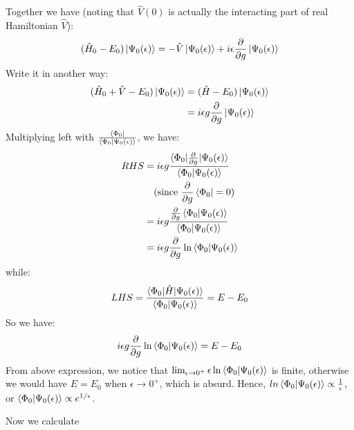 \documentclass{article}
\numberwithin{equation}{subsection} %
\begin{document}
Together we have (noting that $\hat{V}(0)$ is actually the interacting part of real Hamiltonian $\hat{V}$):
\begin{align}
(\hat{H}_0-E_0)\ket{\Psi_0(\epsilon)} = -\hat{V}\ket{\Psi_0(\epsilon)} + i\epsilon \frac{\partial}{\partial g} \ket{\Psi_0(\epsilon)}
\end{align}
Write it in another way:
\begin{align}
(\hat{H}_0+\hat{V}-E_0) \ket{\Psi_0(\epsilon)} &= (\hat{H} -E_0)\ket{\Psi_0(\epsilon)} \nonumber\\
&= i\epsilon g \frac{\partial}{\partial g} \ket{\Psi_0(\epsilon)}
\label{eq:6.50}
\end{align}
Multiplying left with
$\frac{\bra{\Phi_0}}{\braket{\Phi_0|\Psi_0(\epsilon)}}$,
we have:
\begin{align}
RHS &= i\epsilon g
\frac{
	\braket{\Phi_0|\frac{\partial}{\partial g} |\Psi_0(\epsilon)}
}
{\braket{\Phi_0|\Psi_0(\epsilon)}
}\nonumber\\
&\text{\quad(since 
	$\frac{\partial}{\partial g} \bra{\Phi_0}=0$)}\nonumber\\
&= i\epsilon g
\frac{
	\frac{\partial}{\partial g}\braket{\Phi_0|\Psi_0(\epsilon)}
}
{
	\braket{\Phi_0|\Psi_0(\epsilon)}
}\nonumber\\
&=i \epsilon g \frac{\partial}{\partial g}
\ln\braket{\Phi_0|\Psi_0(\epsilon)}
\end{align}
while:
\begin{align}
LHS = \frac{
	\braket{\Phi_0|\hat{H} | \Psi_0(\epsilon)}
}{
\braket{\Phi_0|\Psi_0(\epsilon)}
}
= E-E_0
\end{align}
So we have:
\begin{align} i \epsilon g \frac{\partial}{\partial g}
\ln\braket{\Phi_0|\Psi_0(\epsilon)} = E-E_0 
\label{eq:6.51}
\end{align}
From above expression, we notice that 
$\lim_{\epsilon\to 0^+} \epsilon \ln\braket{\Phi_0|\Psi_0(\epsilon)}$ is finite, otherwise we would have $E=E_0$ when $\epsilon\to 0^+$, which is absurd. Hence, $ln \braket{\Phi_0| \Psi_0(\epsilon)} \propto \frac{1}{\epsilon}$, or $\braket{\Phi_0| \Psi_0(\epsilon)} \propto e^{1/\epsilon}$.

Now we calculate
\end{document}
